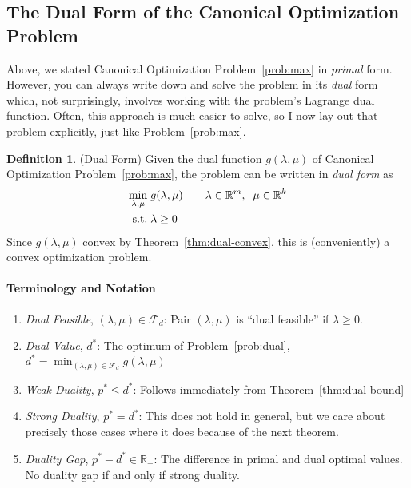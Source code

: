 \documentclass[12pt]{book}
\numberwithin{equation}{section} %
\theoremstyle{plain}
\theoremstyle{definition}
\newtheorem{defn}[thm]{Definition}
\theoremstyle{remark}
\newcommand{\R}{\mathbb{R}}
\begin{document}
\subsection{The Dual Form of the Canonical Optimization Problem}

Above, we stated Canonical Optimization Problem~\ref{prob:max} in
\emph{primal} form.
However, you can always write down and solve the problem in its
\emph{dual} form which, not surprisingly, involves working with the
problem's Lagrange dual function. Often, this approach is much easier to
solve, so I now lay out that problem explicitly, just like
Problem~\ref{prob:max}.

\begin{defn}(Dual Form)
Given the dual function $g(\lambda,\mu)$ of Canonical Optimization
Problem~\ref{prob:max}, the problem can be written in \emph{dual form}
as
\begin{align}
  \min_{\lambda,\mu} \; &g(\lambda,\mu)
  \qquad \lambda\in\R^m,\;\;\mu\in\R^k
  \label{prob:dual}
  \\
  \text{s.t.} \; &\lambda \geq 0\notag
\end{align}
Since $g(\lambda,\mu)$ convex by Theorem~\ref{thm:dual-convex}, this
is (conveniently) a convex optimization problem.

\paragraph{Terminology and Notation}
\begin{enumerate}
  \item \emph{Dual Feasible}, $(\lambda,\mu)\in\mathscr{F}_d$: Pair
    $(\lambda,\mu)$ is ``dual feasible'' if $\lambda\geq 0$.
  \item \emph{Dual Value}, $d^*$: The optimum of
    Problem~\ref{prob:dual}, $d^* = \min_{(\lambda,\mu)\in\mathscr{F}_d}
    g(\lambda,\mu)$
  \item \emph{Weak Duality}, $p^*\leq d^*$:
    Follows immediately from Theorem~\ref{thm:dual-bound}
  \item \emph{Strong Duality}, $p^*=d^*$: This does not hold in general,
    but we care about precisely those cases where it does because of the
    next theorem.
  \item \emph{Duality Gap}, $p^*-d^*\in\R_+$:
    The difference in primal and dual optimal values.
    No duality gap if and only if strong duality.
\end{enumerate}
\end{defn}
\end{document}
